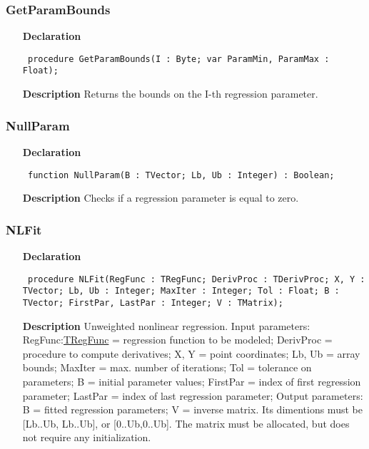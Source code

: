 \documentclass[12pt,a4paper,oneside]{report}
\newcommand{\declarationitem}[1]{\textbf{#1}}
\newcommand{\descriptiontitle}[1]{\textbf{#1}}
\newcommand{\code}[1]{\texttt{#1}}
\begin{document}
\subsubsection{GetParamBounds}
\label{unlfit-GetParamBounds}
\begin{itemize}\item[\declarationitem{Declaration}\hfill]
	\begin{flushleft}
		\code{
			procedure GetParamBounds(I : Byte; var ParamMin, ParamMax : Float);}
		
	\end{flushleft}
	
	\par
	\item[\descriptiontitle{Description}]
	Returns the bounds on the I{-}th regression parameter.
	
\end{itemize}
\subsubsection{NullParam}
\label{unlfit-NullParam}
\begin{itemize}\item[\declarationitem{Declaration}\hfill]
	\begin{flushleft}
		\code{
			function NullParam(B : TVector; Lb, Ub : Integer) : Boolean;}
		
	\end{flushleft}
	
	\par
	\item[\descriptiontitle{Description}]
	Checks if a regression parameter is equal to zero.
	
\end{itemize}
\subsubsection{NLFit}
\label{unlfit-NLFit}
\begin{itemize}\item[\declarationitem{Declaration}\hfill]
	\begin{flushleft}
		\code{
			procedure NLFit(RegFunc : TRegFunc; DerivProc : TDerivProc; X, Y : TVector; Lb, Ub : Integer; MaxIter : Integer; Tol : Float; B : TVector; FirstPar, LastPar : Integer; V : TMatrix);}
	\end{flushleft}
	\item[\descriptiontitle{Description}]
	Unweighted nonlinear regression. Input parameters: RegFunc:\hyperref[utypes-TRegFunc]{TRegFunc} = regression function to be modeled; DerivProc = procedure to compute derivatives; X, Y = point coordinates; Lb, Ub = array bounds; MaxIter = max. number of iterations; Tol = tolerance on parameters; B = initial parameter values; FirstPar = index of first regression parameter; LastPar = index of last regression parameter; Output parameters: B = fitted regression parameters; V = inverse matrix. Its dimentions must be [Lb..Ub, Lb..Ub], or [0..Ub,0..Ub]. The matrix must be allocated, but does not require any initialization.
\end{itemize}
\end{document}
